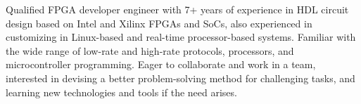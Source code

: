 

\begin{cvparagraph}
Qualified FPGA developer engineer with 7+ years of experience in HDL circuit design based on Intel and Xilinx FPGAs and SoCs, also experienced in customizing in Linux-based and real-time processor-based systems. Familiar with the wide range of low-rate and high-rate protocols, processors, and microcontroller programming. Eager to collaborate and work in a team, interested in devising a better problem-solving method for challenging tasks, and learning new technologies and tools if the need arises.
\end{cvparagraph}
